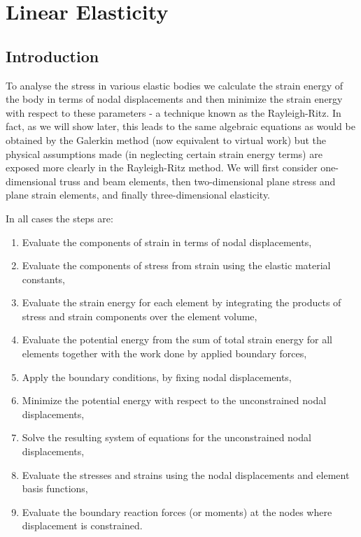 \chapter{Linear Elasticity} 
\label{cha:linearelasticity}

\section{Introduction}
\label{sec:Intro}

To analyse the stress in various elastic bodies we calculate the strain energy
of the body in terms of nodal displacements and then minimize the strain
energy with respect to these parameters - a technique known as the
Rayleigh-Ritz. In fact, as we will show later, this leads to
the same algebraic equations as would be obtained by the Galerkin method (now
equivalent to virtual work) but the physical assumptions made (in neglecting
certain strain energy terms) are exposed more clearly in the Rayleigh-Ritz
method. We will first consider one-dimensional truss and beam elements, then
two-dimensional plane stress and plane strain elements, and finally
three-dimensional elasticity.

In all cases the steps are:
\begin{enumerate}
  \item Evaluate the components of strain in terms of nodal displacements,
  \item Evaluate the components of stress from strain using the elastic 
   material constants,
  \item  Evaluate the strain energy for each element by integrating the 
   products of stress and strain components over the element volume,
  \item  Evaluate the potential energy from the sum of total strain energy for
   all elements together with the work done by applied boundary forces, 
  \item  Apply the boundary conditions, \eg by fixing nodal displacements,
  \item  Minimize the potential energy with respect to the unconstrained nodal
   displacements,
  \item  Solve the resulting system of equations for the unconstrained nodal 
   displacements,
  \item  Evaluate the stresses and strains using the nodal displacements and 
   element basis functions,
  \item  Evaluate the boundary reaction forces (or moments) at the nodes where
   displacement is constrained. 
\end{enumerate}

